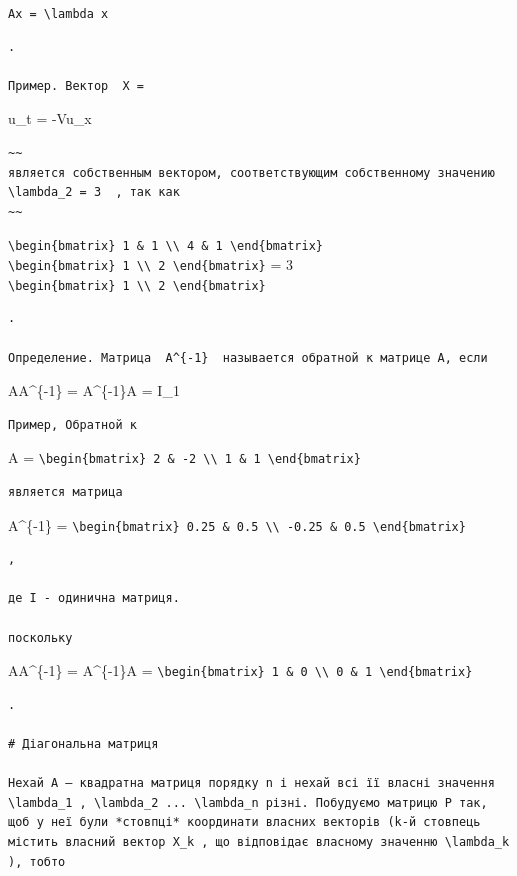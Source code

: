 \documentclass[
  ukrainian,
]{article}
\begin{document}
\texttt{Ax\ =\ \textbackslash{}lambda\ x}

\begin{verbatim}
.

Пример. Вектор  X =
\end{verbatim}

u\_t = -Vu\_x

\begin{verbatim}
~~
является собственным вектором, соответствующим собственному значению  \lambda_2 = 3  , так как
~~
\end{verbatim}

\texttt{\textbackslash{}begin\{bmatrix\}\ 1\ \&\ 1\ \textbackslash{}\textbackslash{}\ 4\ \&\ 1\ \textbackslash{}end\{bmatrix\}}
\texttt{\textbackslash{}begin\{bmatrix\}\ 1\ \textbackslash{}\textbackslash{}\ 2\ \textbackslash{}end\{bmatrix\}}
= 3
\texttt{\textbackslash{}begin\{bmatrix\}\ 1\ \textbackslash{}\textbackslash{}\ 2\ \textbackslash{}end\{bmatrix\}}

\begin{verbatim}
.

Определение. Матрица  A^{-1}  называется обратной к матрице A, если
\end{verbatim}

AA\^{}\{-1\} = A\^{}\{-1\}A = I\_1

\begin{verbatim}
Пример, Обратной к
\end{verbatim}

A =
\texttt{\textbackslash{}begin\{bmatrix\}\ 2\ \&\ -2\ \textbackslash{}\textbackslash{}\ 1\ \&\ 1\ \textbackslash{}end\{bmatrix\}}

\begin{verbatim}
является матрица
\end{verbatim}

A\^{}\{-1\} =
\texttt{\textbackslash{}begin\{bmatrix\}\ 0.25\ \&\ 0.5\ \textbackslash{}\textbackslash{}\ -0.25\ \&\ 0.5\ \textbackslash{}end\{bmatrix\}}

\begin{verbatim}
,

де I - одинична матриця.

поскольку
\end{verbatim}

AA\^{}\{-1\} = A\^{}\{-1\}A =
\texttt{\textbackslash{}begin\{bmatrix\}\ 1\ \&\ 0\ \textbackslash{}\textbackslash{}\ 0\ \&\ 1\ \textbackslash{}end\{bmatrix\}}

\begin{verbatim}
.

# Діагональна матриця

Нехай A — квадратна матриця порядку n і нехай всі її власні значення \lambda_1 , \lambda_2 ... \lambda_n різні. Побудуємо матрицю P так, щоб у неї були *стовпці* координати власних векторів (k-й стовпець містить власний вектор X_k , що відповідає власному значенню \lambda_k ), тобто
\end{verbatim}
\end{document}
